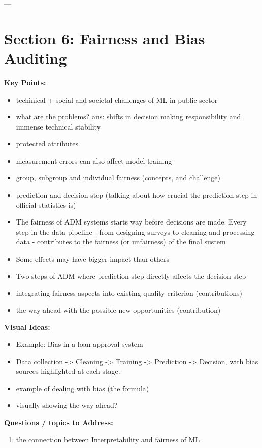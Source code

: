 \documentclass[a4paper,12pt]{article}
\begin{document}
---

\section{Section 6: Fairness and Bias Auditing}
\textbf{Key Points:}
\begin{itemize}[label=\textbullet, leftmargin=1cm]
    \item techinical + social and societal challenges of ML in public sector
    \item what are the problems? ans: shifts in decision making responsibility and immense technical stability
    \item protected attributes
    \item measurement errors can also affect model training
    \item group, subgroup and individual fairness (concepts, and challenge)
    \item prediction and decision step (talking about how crucial the prediction step in official statistics is)
    \item The fairness of ADM systems starts way before decisions are made. Every step in the data pipeline - from designing surveys to cleaning and processing data - contributes to the fairness (or unfairness) of the final sustem
    \item Some effects may have bigger impact than others
    \item Two steps of ADM where prediction step directly affects the decision step
    \item integrating fairness aspects into existing quality criterion (contributions)
    \item the way ahead with the possible new opportunities (contribution)
\end{itemize}

\textbf{Visual Ideas:}
\begin{itemize}[label=$\star$, leftmargin=1cm]
    \item Example: Bias in a loan approval system 
    \item Data collection -> Cleaning -> Training -> Prediction -> Decision, with bias sources highlighted at each stage.
    \item example of dealing with bias (the formula)
    \item visually showing the way ahead? 
\end{itemize}


\textbf{Questions / topics to Address:}
\begin{enumerate}[label=Q\arabic*:, leftmargin=1cm]
    \item the connection between Interpretability and fairness of ML
\end{enumerate}
\end{document}
